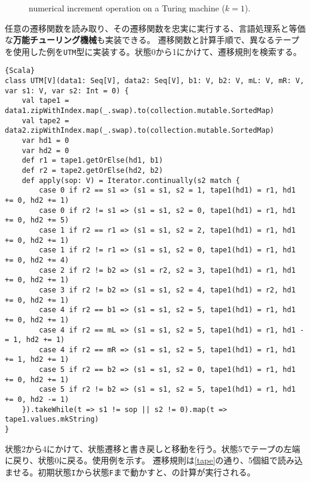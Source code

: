 \documentclass[10pt,a4paper]{book}
\begin{document}
\begin{figure}[h]
\centering
{} \quad
{} \quad
{}
\caption{numerical increment operation on a Turing machine ($k=1$).\label{fig:tape}}
\end{figure}

任意の遷移関数を読み取り、その遷移関数を忠実に実行する、言語処理系と等価な\textbf{万能チューリング機械}も実装できる。
遷移関数と計算手順で、異なるテープを使用した例を\texttt{UTM}型に実装する。状態0から1にかけて、遷移規則を検索する。

\begin{Verbatim}{Scala}
class UTM[V](data1: Seq[V], data2: Seq[V], b1: V, b2: V, mL: V, mR: V, var s1: V, var s2: Int = 0) {
	val tape1 = data1.zipWithIndex.map(_.swap).to(collection.mutable.SortedMap)
	val tape2 = data2.zipWithIndex.map(_.swap).to(collection.mutable.SortedMap)
	var hd1 = 0
	var hd2 = 0
	def r1 = tape1.getOrElse(hd1, b1)
	def r2 = tape2.getOrElse(hd2, b2)
	def apply(sop: V) = Iterator.continually(s2 match {
		case 0 if r2 == s1 => (s1 = s1, s2 = 1, tape1(hd1) = r1, hd1 += 0, hd2 += 1)
		case 0 if r2 != s1 => (s1 = s1, s2 = 0, tape1(hd1) = r1, hd1 += 0, hd2 += 5)
		case 1 if r2 == r1 => (s1 = s1, s2 = 2, tape1(hd1) = r1, hd1 += 0, hd2 += 1)
		case 1 if r2 != r1 => (s1 = s1, s2 = 0, tape1(hd1) = r1, hd1 += 0, hd2 += 4)
		case 2 if r2 != b2 => (s1 = r2, s2 = 3, tape1(hd1) = r1, hd1 += 0, hd2 += 1)
		case 3 if r2 != b2 => (s1 = s1, s2 = 4, tape1(hd1) = r2, hd1 += 0, hd2 += 1)
		case 4 if r2 == b1 => (s1 = s1, s2 = 5, tape1(hd1) = r1, hd1 += 0, hd2 += 1)
		case 4 if r2 == mL => (s1 = s1, s2 = 5, tape1(hd1) = r1, hd1 -= 1, hd2 += 1)
		case 4 if r2 == mR => (s1 = s1, s2 = 5, tape1(hd1) = r1, hd1 += 1, hd2 += 1)
		case 5 if r2 == b2 => (s1 = s1, s2 = 0, tape1(hd1) = r1, hd1 += 0, hd2 += 1)
		case 5 if r2 != b2 => (s1 = s1, s2 = 5, tape1(hd1) = r1, hd1 += 0, hd2 -= 1)
	}).takeWhile(t => s1 != sop || s2 != 0).map(t => tape1.values.mkString)
}
\end{Verbatim}

状態2から4にかけて、状態遷移と書き戻しと移動を行う。状態5でテープの左端に戻り、状態0に戻る。使用例を示す。
遷移規則は\eqref{tape}の通り、5個組で読み込ませる。初期状態\texttt{I}から状態\texttt{F}まで動かすと、の計算が実行される。
\end{document}
